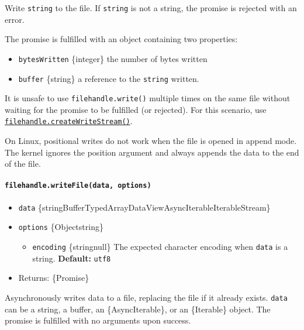 Write \texttt{string} to the file. If \texttt{string} is not a string,
the promise is rejected with an error.

The promise is fulfilled with an object containing two properties:

\begin{itemize}
\tightlist
\item
  \texttt{bytesWritten} \{integer\} the number of bytes written
\item
  \texttt{buffer} \{string\} a reference to the \texttt{string} written.
\end{itemize}

It is unsafe to use \texttt{filehandle.write()} multiple times on the
same file without waiting for the promise to be fulfilled (or rejected).
For this scenario, use
\hyperref[filehandlecreatewritestreamoptions]{\texttt{filehandle.createWriteStream()}}.

On Linux, positional writes do not work when the file is opened in
append mode. The kernel ignores the position argument and always appends
the data to the end of the file.

\paragraph{\texorpdfstring{\texttt{filehandle.writeFile(data,\ options)}}{filehandle.writeFile(data, options)}}\label{filehandle.writefiledata-options}

\begin{itemize}
\tightlist
\item
  \texttt{data}
  \{string\textbar Buffer\textbar TypedArray\textbar DataView\textbar AsyncIterable\textbar Iterable\textbar Stream\}
\item
  \texttt{options} \{Object\textbar string\}

  \begin{itemize}
  \tightlist
  \item
    \texttt{encoding} \{string\textbar null\} The expected character
    encoding when \texttt{data} is a string. \textbf{Default:}
    \texttt{\textquotesingle{}utf8\textquotesingle{}}
  \end{itemize}
\item
  Returns: \{Promise\}
\end{itemize}

Asynchronously writes data to a file, replacing the file if it already
exists. \texttt{data} can be a string, a buffer, an \{AsyncIterable\},
or an \{Iterable\} object. The promise is fulfilled with no arguments
upon success.

